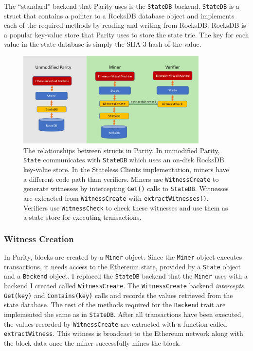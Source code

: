 \documentclass[12pt]{article}
\newcommand{\System}{Stateless Clients\xspace}
\newcommand{\figurewidth}{0.85\textwidth}
\begin{document}
The ``standard'' backend that Parity uses is the \texttt{StateDB} backend. \texttt{StateDB} is a struct that contains a pointer to a RocksDB database object and implements each of the required methods by reading and writing from RocksDB. RocksDB is a popular key-value store that Parity uses to store the state trie. The key for each value in the state database is simply the SHA-3 hash of the value.

\begin{figure}[H]
  \centering
  \includegraphics[width=\figurewidth]{../figures/implementation/code_layout.pdf}
  \caption{The relationships between structs in Parity. In unmodified Parity, \texttt{State} communicates with \texttt{StateDB} which uses an on-disk RocksDB key-value store. In the \System implementation, miners have a different code path than verifiers. Miners use \texttt{WitnessCreate} to generate witnesses by intercepting \texttt{Get()} calls to \texttt{StateDB}. Witnesses are extracted from \texttt{WitnessCreate} with \texttt{extractWitnesses()}. Verifiers use \texttt{WitnessCheck} to check these witnesses and use them as a state store for executing transactions.}
  \label{fig:parityrelationships}
\end{figure}

\subsubsection{Witness Creation}

In Parity, blocks are created by a \texttt{Miner} object. Since the \texttt{Miner} object executes transactions, it needs access to the Ethereum state, provided by a \texttt{State} object and a \texttt{Backend} object. I replaced the \texttt{StateDB} backend that the \texttt{Miner} uses with a backend I created called \texttt{WitnessCreate}. The \texttt{WitnessCreate} backend \emph{intercepts} \texttt{Get(key)} and \texttt{Contains(key)} calls and records the values retrieved from the state database. The rest of the methods required for the \texttt{Backend} trait are implemented the same as in \texttt{StateDB}. After all transactions have been executed, the values recorded by \texttt{WitnessCreate} are extracted with a function called \texttt{extractWitness}. This witness is broadcast to the Ethereum network along with the block data once the miner successfully mines the block.
\end{document}
